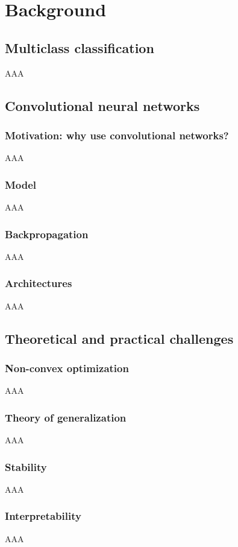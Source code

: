 \section{Background}
\label{sec1a}

\subsection{Multiclass classification}

AAA \\

\subsection{Convolutional neural networks}

\subsubsection{Motivation: why use convolutional networks?}

AAA \\

\subsubsection{Model}

AAA \\

\subsubsection{Backpropagation}

AAA \\

\subsubsection{Architectures}

AAA \\

\subsection{Theoretical and practical challenges}

\subsubsection{Non-convex optimization}

AAA \\

\subsubsection{Theory of generalization}

AAA \\

\subsubsection{Stability}

AAA \\

\subsubsection{Interpretability}

AAA \\